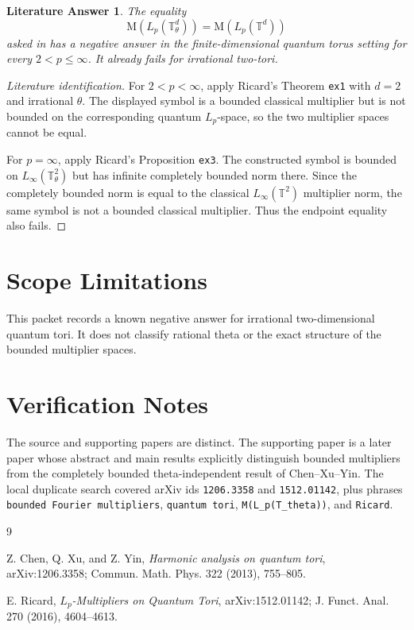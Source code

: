\documentclass[11pt]{article}
\newtheorem*{theorem}{Literature Answer}
\begin{document}
\begin{theorem}
The equality
\[
\mathrm{M}(L_p(\mathbb T^d_\theta))=\mathrm{M}(L_p(\mathbb T^d))
\]
asked in \cite{CXY} has a negative answer in the finite-dimensional quantum
torus setting for every \(2<p\leq\infty\). It already fails for irrational
two-tori.
\end{theorem}

\begin{proof}[Literature identification]
For \(2<p<\infty\), apply Ricard's Theorem \texttt{ex1} with \(d=2\) and
irrational \(\theta\). The displayed symbol is a bounded classical multiplier
but is not bounded on the corresponding quantum \(L_p\)-space, so the two
multiplier spaces cannot be equal.

For \(p=\infty\), apply Ricard's Proposition \texttt{ex3}. The constructed
symbol is bounded on \(L_\infty(\mathbb T^2_\theta)\) but has infinite
completely bounded norm there. Since the completely bounded norm is equal to
the classical \(L_\infty(\mathbb T^2)\) multiplier norm, the same symbol is not
a bounded classical multiplier. Thus the endpoint equality also fails.
\end{proof}

\section*{Scope Limitations}

This packet records a known negative answer for irrational two-dimensional
quantum tori. It does not classify rational theta or the exact structure of
the bounded multiplier spaces.

\section*{Verification Notes}

The source and supporting papers are distinct. The supporting paper is a later
paper whose abstract and main results explicitly distinguish bounded
multipliers from the completely bounded theta-independent result of
Chen--Xu--Yin. The local duplicate search covered arXiv ids
\texttt{1206.3358} and \texttt{1512.01142}, plus phrases
\texttt{bounded Fourier multipliers}, \texttt{quantum tori},
\texttt{M(L\_p(T\_theta))}, and \texttt{Ricard}.

\begin{thebibliography}{9}

Z. Chen, Q. Xu, and Z. Yin,
\emph{Harmonic analysis on quantum tori},
arXiv:1206.3358; Commun. Math. Phys. 322 (2013), 755--805.

E. Ricard,
\emph{\(L_p\)-Multipliers on Quantum Tori},
arXiv:1512.01142; J. Funct. Anal. 270 (2016), 4604--4613.

\end{thebibliography}
\end{document}
